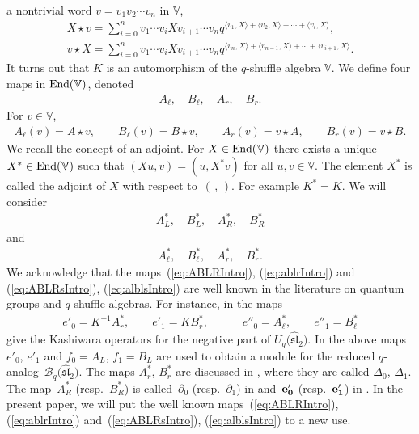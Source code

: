 \documentclass[pdftex]{sigma}
\numberwithin{equation}{section}
\begin{document}
 a nontrivial word $v= v_1v_2\cdots v_n$ in $\mathbb V$,
\begin{gather*}
X \star v =
\sum_{i=0}^n v_1 \cdots v_{i} X v_{i+1} \cdots v_n
q^{\langle v_1, X\rangle+
\langle v_2, X\rangle+
\cdots + \langle v_{i}, X\rangle},
\\
v \star X = \sum_{i=0}^n v_1 \cdots v_{i} X v_{i+1} \cdots v_n
q^{\langle v_{n},X\rangle
+\langle v_{n-1},X\rangle
+\cdots+
\langle v_{i+1},X\rangle}.
\end{gather*}
It turns out that $K$ is an automorphism of the $q$-shuffle algebra $\mathbb V$.
We define four maps in
${\rm End}(\mathbb V)$, denoted
\begin{gather}
A_{\ell}, \quad B_{\ell}, \quad A_r, \quad B_r.\label{eq:ablrIntro}
\end{gather}
For $v \in \mathbb V$,
\begin{gather*}
A_{\ell}(v) = A\star v, \qquad
B_{\ell}(v) = B\star v,
\qquad
A_r(v) = v\star A,
\qquad
B_r(v) = v\star B.
\end{gather*}
We recall the concept of an adjoint.
For $X \in {\rm End}(\mathbb V)$ there exists
a unique $X^* \in {\rm End}(\mathbb V)$ such that
$(Xu,v) = (u, X^*v)$ for all $u,v \in \mathbb V$.
The element $X^*$ is called the adjoint of $X$ with
respect to~$(\, ,\,)$. For example $K^*=K$.
We will consider
\begin{gather}
A^*_L, \quad
B^*_L, \quad
A^*_R, \quad
B^*_R\label{eq:ABLRsIntro}
\end{gather}
and
\begin{gather}\label{eq:alblsIntro}
A^*_\ell, \quad B^*_\ell, \quad A^*_r,\quad B^*_r.
\end{gather}
We acknowledge that the
maps~(\ref{eq:ABLRIntro}),
(\ref{eq:ablrIntro})
and
(\ref{eq:ABLRsIntro}),
(\ref{eq:alblsIntro})
are well known in the
literature on quantum groups and $q$-shuffle algebras.
For instance,
in \cite[Section~3.4]{kashiwara}
the maps
\begin{gather*}
e'_0= K^{-1}A^*_r,
\qquad e'_1=KB^*_r,
\qquad \quad
e''_0=A^*_\ell, \qquad
e''_1=B^*_\ell
\end{gather*}
give the Kashiwara operators for the negative
part of $U_q\big(\widehat{\mathfrak{sl}}_2\big)$.
In \cite[Lemma~3.4.2]{kashiwara} the above maps $e'_0$, $e'_1$ and $f_0=A_L$, $f_1=B_L$ are used
to obtain a module for the reduced $q$-analog~$\mathcal B_q\big(\widehat{\mathfrak{sl}}_2\big)$.
The maps $A^*_r$, $B^*_r$ are discussed in \cite[Definition~4.2]{green}, where they are called
$\Delta_0$, $\Delta_1$. The map~$A^*_R$ (resp.~$B^*_R$) is called~$\partial_0$ (resp.~$\partial_1$) in
 \cite[Section~3.1]{green} and~${\bf e'_0}$ (resp.~${\bf e'_1}$) in \cite[p.~696]{leclerc}.
In the present paper, we will put the well known maps~(\ref{eq:ABLRIntro}),
(\ref{eq:ablrIntro})
and~(\ref{eq:ABLRsIntro}), (\ref{eq:alblsIntro}) to a new use.
\end{document}
